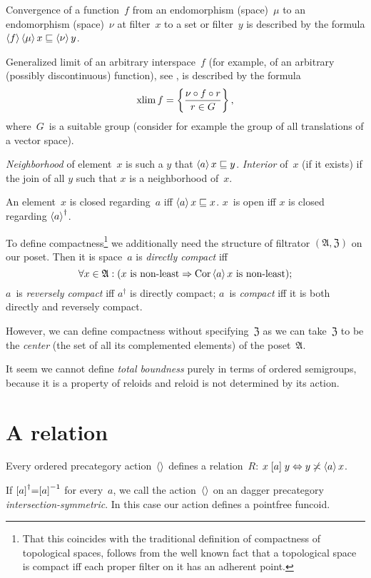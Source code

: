 Convergence of a function~$f$ from an endomorphism (space)~$\mu$ to an endomorphism (space)~$\nu$ at filter~$x$ to a set or filter~$y$ is described by the formula $\left\langle f\right\rangle\left\langle \mu\right\rangle x\sqsubseteq\left\langle \nu\right\rangle y$.

Generalized limit of an arbitrary interspace~$f$ (for example, of an arbitrary (possibly discontinuous) function), see \cite{limit}, is described by the formula \[ \operatorname{xlim} f=\left\{ \frac{\nu\circ f\circ r}{r\in G}\right\}, \]
where~$G$~is a suitable group (consider for example the group of all translations of a vector space).

\emph{Neighborhood} of element~$x$ is such a $y$ that $\left\langle a\right\rangle x\sqsubseteq y$. \emph{Interior} of~$x$ (if it exists) if the join of all $y$ such that $x$ is a neighborhood of~$x$.

An element~$x$ is closed regarding~$a$ iff $\left\langle a\right\rangle x\sqsubseteq x$. $x$~is open iff $x$ is closed regarding $\left\langle a\right\rangle^{\dagger}$.

To define compactness\footnote{That this coincides with the traditional definition of compactness of topological spaces, follows from the well known fact that a topological space is compact iff each proper filter on it has an adherent point.} we additionally need the structure of filtrator $(\mathfrak{A},\mathfrak{Z})$ on our poset. Then it is space~$a$ is \emph{directly compact} iff
\[\forall x\in\mathfrak{A}:(x\text{ is non-least}\Rightarrow\operatorname{Cor}\left\langle a\right\rangle x\text{ is non-least}); \]
$a$~is \emph{reversely compact} iff $a^{\dagger}$ is directly compact; $a$~is \emph{compact} iff it is both directly and reversely compact.

However, we can define compactness without specifying~$\mathfrak{Z}$ as we can take~$\mathfrak{Z}$ to be the \emph{center} (the set of all its complemented elements) of the poset~$\mathfrak{A}$.

It seem we cannot define \emph{total boundness} purely in terms of ordered semigroups, because it is a property of reloids and reloid is not determined by its action.

\chapter{A relation}

Every ordered precategory action~$\left\langle \right\rangle$ defines a relation~$R$: $x\mathrel{\left[a\right]}y\Leftrightarrow y\not\asymp\left\langle a\right\rangle x$.

If $\mathrel{\left[a\right]}^{\dagger}=\mathrel{\left[a\right]}^{-1}$ for every~$a$, we call the action~$\left\langle \right\rangle$ on an dagger precategory \emph{inter\-sec\-tion-sym\-met\-ric}. In this case our action defines a pointfree funcoid.

